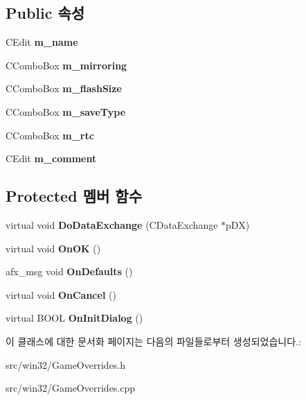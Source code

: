 \subsection*{Public 속성}
\begin{DoxyCompactItemize}
\item 
\mbox{\label{class_game_overrides_a5726c0df72b2d2f43ee641026409f026}} 
C\+Edit {\bfseries m\+\_\+name}
\item 
\mbox{\label{class_game_overrides_a3aeea798546add267de2b8a59b4d6e0e}} 
C\+Combo\+Box {\bfseries m\+\_\+mirroring}
\item 
\mbox{\label{class_game_overrides_a3f75d6a84d709bc9052eae826ae4b1c3}} 
C\+Combo\+Box {\bfseries m\+\_\+flash\+Size}
\item 
\mbox{\label{class_game_overrides_ac56384b1ec6d9198db961d3d88e5bbc7}} 
C\+Combo\+Box {\bfseries m\+\_\+save\+Type}
\item 
\mbox{\label{class_game_overrides_a68ff1f6bae098f28c5f7a30b90141781}} 
C\+Combo\+Box {\bfseries m\+\_\+rtc}
\item 
\mbox{\label{class_game_overrides_a8fda5a63d4695c79b4bb430717a01daa}} 
C\+Edit {\bfseries m\+\_\+comment}
\end{DoxyCompactItemize}
\subsection*{Protected 멤버 함수}
\begin{DoxyCompactItemize}
\item 
\mbox{\label{class_game_overrides_aa12ac9e6f357416fd5ae76a241bf3e95}} 
virtual void {\bfseries Do\+Data\+Exchange} (C\+Data\+Exchange $\ast$p\+DX)
\item 
\mbox{\label{class_game_overrides_ab007ed7280044a2b07f162f430bb2a20}} 
virtual void {\bfseries On\+OK} ()
\item 
\mbox{\label{class_game_overrides_a5007baf79bb85e18fc2366b0d82c4e38}} 
afx\+\_\+msg void {\bfseries On\+Defaults} ()
\item 
\mbox{\label{class_game_overrides_a2bc2c17acb1982dafe3d376c84c369df}} 
virtual void {\bfseries On\+Cancel} ()
\item 
\mbox{\label{class_game_overrides_ace316fc35c2d3b36f7889752c03222a9}} 
virtual B\+O\+OL {\bfseries On\+Init\+Dialog} ()
\end{DoxyCompactItemize}


이 클래스에 대한 문서화 페이지는 다음의 파일들로부터 생성되었습니다.\+:\begin{DoxyCompactItemize}
\item 
src/win32/Game\+Overrides.\+h\item 
src/win32/Game\+Overrides.\+cpp\end{DoxyCompactItemize}
